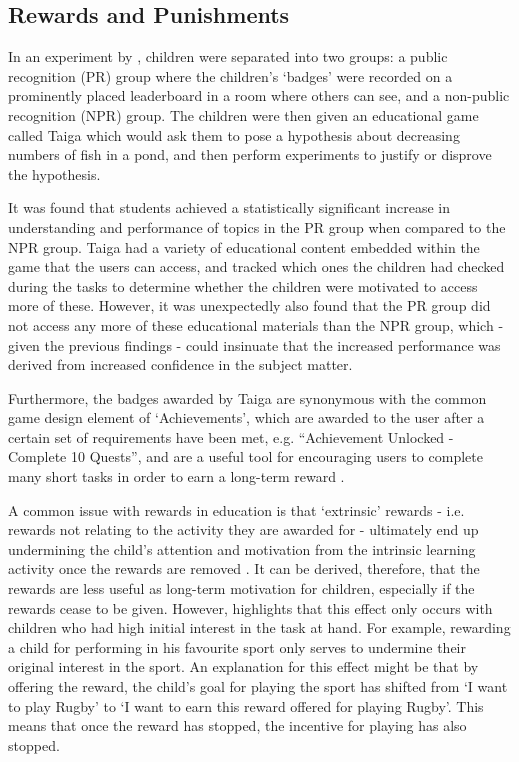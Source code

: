 \subsection{Rewards and Punishments}
In an experiment by \cite{Filsecker2014136}, children were separated into two groups: a public recognition (PR) group where the children's `badges' were recorded on a prominently placed leaderboard in a room where others can see, and a non-public recognition (NPR) group.
The children were then given an educational game called Taiga which would ask them to pose a hypothesis about decreasing numbers of fish in a pond, and then perform experiments to justify or disprove the hypothesis.

It was found that students achieved a statistically significant increase in understanding and performance of topics in the PR group when compared to the NPR group.
Taiga had a variety of educational content embedded within the game that the users can access, and tracked which ones the children had checked during the tasks to determine whether the children were motivated to access more of these. 
However, it was unexpectedly also found that the PR group did not access any more of these educational materials than the NPR group, which - given the previous findings - could insinuate that the increased performance was derived from increased confidence in the subject matter. 

Furthermore, the badges awarded by Taiga are synonymous with the common game design element of `Achievements', which are awarded to the user after a certain set of requirements have been met, e.g. ``Achievement Unlocked - Complete 10 Quests'', and are a useful tool for encouraging users to complete many short tasks in order to earn a long-term reward \cite{hamari2011framework}.

A common issue with rewards in education is that `extrinsic' rewards - i.e. rewards not relating to the activity they are awarded for - ultimately end up undermining the child's attention and motivation from the intrinsic learning activity once the rewards are removed \citep{deci2001extrinsic,ACP:ACP2350090502}.
It can be derived,  therefore, that the rewards are less useful as long-term motivation for children, especially if the rewards cease to be given.
However, \cite{cameron2001negative} highlights that this effect only occurs with children who had high initial interest in the task at hand. 
For example, rewarding a child for performing in his favourite sport only serves to undermine their original interest in the sport.
An explanation for this effect might be that by offering the reward, the child's goal for playing the sport has shifted from `I want to play Rugby' to `I want to earn this reward offered for playing Rugby'.
This means that once the reward has stopped, the incentive for playing has also stopped.

